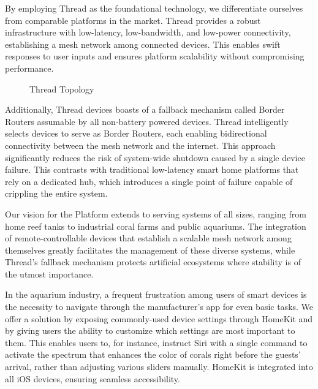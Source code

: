 \documentclass[8pt,twocolumn]{article}
\begin{document}
By employing Thread as the foundational technology, we differentiate ourselves from comparable platforms in the market. Thread provides a robust infrastructure with low-latency, low-bandwidth, and low-power connectivity, establishing a mesh network among connected devices. This enables swift responses to user inputs and ensures platform scalability without compromising performance.

\begin{figure}[!htbp]
    \centering
    \caption{Thread Topology \protect\cite{thread_topology}}
\end{figure}

Additionally, Thread devices boasts of a fallback mechanism called Border Routers assumable by all non-battery powered devices. Thread intelligently selects devices to serve as Border Routers, each enabling bidirectional connectivity between the mesh network and the internet. This approach significantly reduces the risk of system-wide shutdown caused by a single device failure. This contrasts with traditional low-latency smart home platforms that rely on a dedicated hub, which introduces a single point of failure capable of crippling the entire system.

Our vision for the Platform extends to serving systems of all sizes, ranging from home reef tanks to industrial coral farms and public aquariums. The integration of remote-controllable devices that establish a scalable mesh network among themselves greatly facilitates the management of these diverse systems, while Thread's fallback mechanism protects artificial ecosystems where stability is of the utmost importance.

In the aquarium industry, a frequent frustration among users of smart devices is the necessity to navigate through the manufacturer's app for even basic tasks. We offer a solution by exposing commonly-used device settings through HomeKit and by giving users the ability to customize which settings are most important to them. This enables users to, for instance, instruct Siri with a single command to activate the spectrum that enhances the color of corals right before the guests' arrival, rather than adjusting various sliders manually. HomeKit is integrated into all iOS devices, ensuring seamless accessibility.
\end{document}
